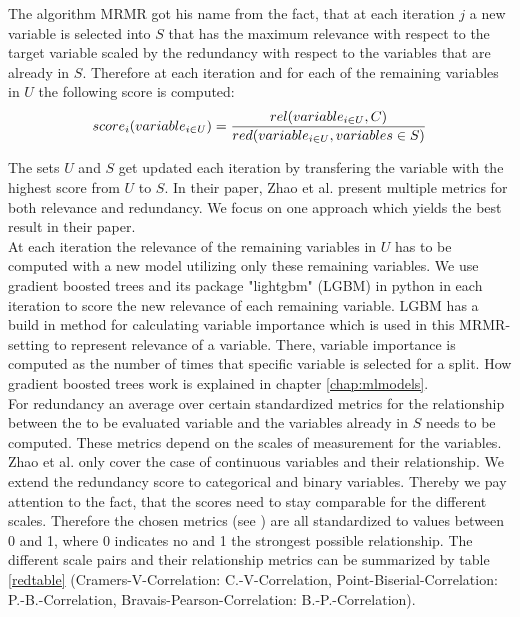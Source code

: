 \documentclass[12pt,titlepage]{article}
\begin{document}
The algorithm MRMR got his name from the fact, that at each iteration $j$ a new variable is selected into $S$ that has the maximum relevance with respect to the target variable scaled by the redundancy with respect to the variables that are already in $S$. Therefore at each iteration and for each of the remaining variables in $U$ the following score is computed:
\vspace{5mm}
\noindent
\begin{equation} \label{score_raw}
    score_{i}(variable_{i \in U}) = \frac{rel(variable_{i \in U}, C)}{red(variable_{i \in U}, variables \in S)} \\
\end{equation}
\vspace{1mm}

\noindent
The sets $U$ and $S$ get updated each iteration by transfering the variable with the highest score from $U$ to $S$. In their paper, Zhao et al. present multiple metrics for both relevance and redundancy. We focus on one approach which yields the best result in their paper. \\
At each iteration the relevance of the remaining variables in $U$ has to be computed with a new model utilizing only these remaining variables. We use gradient boosted trees and its package "lightgbm" (LGBM) in python in each iteration to score the new relevance of each remaining variable. LGBM has a build in method for calculating variable importance which is used in this MRMR-setting to represent relevance of a variable. There, variable importance is computed as the number of times that specific variable is selected for a split. How gradient boosted trees work is explained in chapter \ref{chap:mlmodels}. \\
For redundancy an average over certain standardized metrics for the relationship between the to be evaluated variable and the variables already in $S$ needs to be computed. These metrics depend on the scales of measurement for the variables. Zhao et al. only cover the case of continuous variables and their relationship. We extend the redundancy score to categorical and binary variables. Thereby we pay attention to the fact, that the scores need to stay comparable for the different scales. Therefore the chosen metrics (see \cite{correlation}) are all standardized to values between 0 and 1, where 0 indicates no and 1 the strongest possible relationship. The different scale pairs and their relationship metrics can be summarized by table \ref{redtable} (Cramers-V-Correlation: C.-V-Correlation, Point-Biserial-Correlation: P.-B.-Correlation, Bravais-Pearson-Correlation: B.-P.-Correlation).
\end{document}
